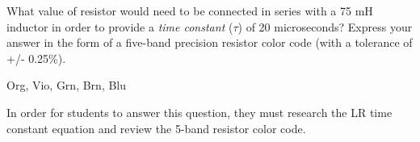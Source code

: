 

What value of resistor would need to be connected in series with a 75 mH inductor in order to provide a {\it time constant} ($\tau$) of 20 microseconds?  Express your answer in the form of a five-band precision resistor color code (with a tolerance of +/- 0.25\%).







Org, Vio, Grn, Brn, Blu







In order for students to answer this question, they must research the LR time constant equation and review the 5-band resistor color code.




